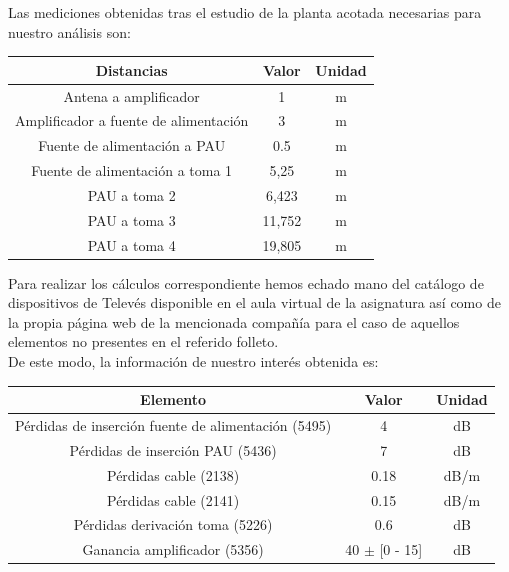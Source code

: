 \documentclass{article}[12 pt]
\begin{document}
		Las mediciones obtenidas tras el estudio de la planta acotada necesarias para nuestro análisis son:

		\vskip 3mm

		\begin{center}
			\begin{tabular}{| c | c | c |}
				\hline
				\textbf{Distancias} & \textbf{Valor} & \textbf{Unidad}\\
				\hline
				Antena a amplificador & 1 & m\\
				\hline
				Amplificador a fuente de alimentación & 3 & m\\
				\hline
				Fuente de alimentación a PAU & 0.5 & m\\
				\hline
				Fuente de alimentación a toma 1 & 5,25 & m\\
				\hline
				PAU a toma 2 & 6,423 & m\\
				\hline
				PAU a toma 3 & 11,752 & m\\
				\hline
				PAU a toma 4  & 19,805 & m\\
				\hline
			\end{tabular}
		\end{center}

		\vskip 3mm

		Para realizar los cálculos correspondiente hemos echado mano del catálogo de dispositivos de Televés disponible en el aula virtual de la asignatura así como de la propia página web de la mencionada compañía para el caso de aquellos elementos no presentes en el referido folleto.\\

		De este modo, la información de nuestro interés obtenida es:

		\vskip 3mm
		\begin{center}
			\begin{tabular}{| c | c | c |}
				\hline
				\textbf{Elemento} & \textbf{Valor} & \textbf{Unidad}\\
				\hline
				Pérdidas de inserción fuente de alimentación (5495) & 4 & dB\\
				\hline
				Pérdidas de inserción PAU (5436) & 7 & dB\\
				\hline
				Pérdidas cable (2138) & 0.18 & dB/m\\
				\hline
				Pérdidas cable (2141) & 0.15 & dB/m\\
				\hline
				Pérdidas derivación toma (5226) & 0.6 & dB\\
				\hline
				Ganancia amplificador (5356) & 40 $\pm$ [0 - 15] & dB\\
				\hline
			\end{tabular}
		\end{center}
\end{document}
